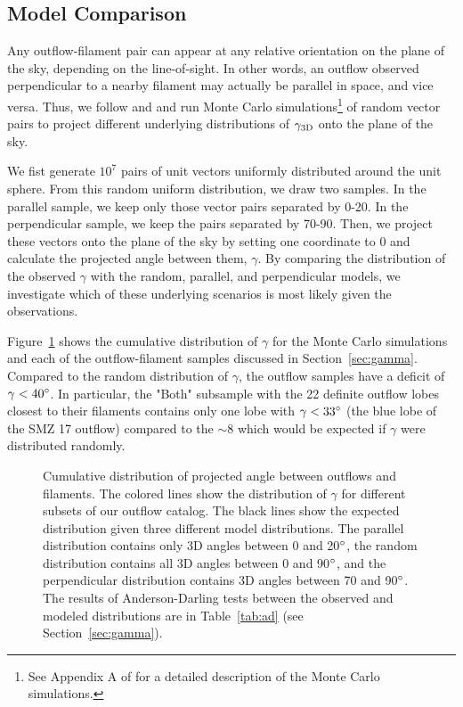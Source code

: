 \documentclass[twocolumn]{aastex63}
\begin{document}
\subsection{Model Comparison}
Any outflow-filament pair can appear at any relative orientation on the plane of the sky, depending on the line-of-sight. In other words, an outflow observed perpendicular to a nearby filament may actually be parallel in space, and vice versa. Thus, we follow \citet{Stephens17} and \citet{Kong19} and run Monte Carlo simulations\footnote{See Appendix A of \citet{Stephens17} for a detailed description of the Monte Carlo simulations.} of random vector pairs to project different underlying distributions of $\gamma_{\rm 3D}$ onto the plane of the sky.

We fist generate $10^7$ pairs of unit vectors uniformly distributed around the unit sphere. From this random uniform distribution, we draw two samples. In the parallel sample, we keep only those vector pairs separated by 0-20\degr. In the perpendicular sample, we keep the pairs separated by 70-90\degr. Then, we project these vectors onto the plane of the sky by setting one coordinate to 0 and calculate the projected angle between them, $\gamma$. By comparing the distribution of the observed $\gamma$ with the random, parallel, and perpendicular models, we investigate which of these underlying scenarios is most likely given the observations.

Figure~\ref{fig:gamma_cdf} shows the cumulative distribution of $\gamma$ for the Monte Carlo simulations and each of the outflow-filament samples discussed in Section~\ref{sec:gamma}. Compared to the random distribution of $\gamma$, the outflow samples have a deficit of $\gamma < 40\mbox{$^\circ$}$. In particular, the "Both" subsample with the 22 definite outflow lobes closest to their filaments contains only one lobe with $\gamma < 33\mbox{$^\circ$}$ (the blue lobe of the SMZ 17 outflow) compared to the $\sim8$ which would be expected if $\gamma$ were distributed randomly.

\begin{figure}
\caption{Cumulative distribution of projected angle between outflows and filaments. The colored lines show the distribution of $\gamma$ for different subsets of our outflow catalog. The black lines show the expected distribution given three different model distributions. The parallel distribution contains only 3D angles between 0 and 20$\mbox{$^\circ$}$, the random distribution contains all 3D angles between 0 and 90$\mbox{$^\circ$}$, and the perpendicular distribution contains 3D angles between 70 and 90$\mbox{$^\circ$}$. The results of Anderson-Darling tests between the observed and modeled distributions are in Table~\ref{tab:ad} (see Section~\ref{sec:gamma}).\label{fig:gamma_cdf}}
\end{figure}
\end{document}
